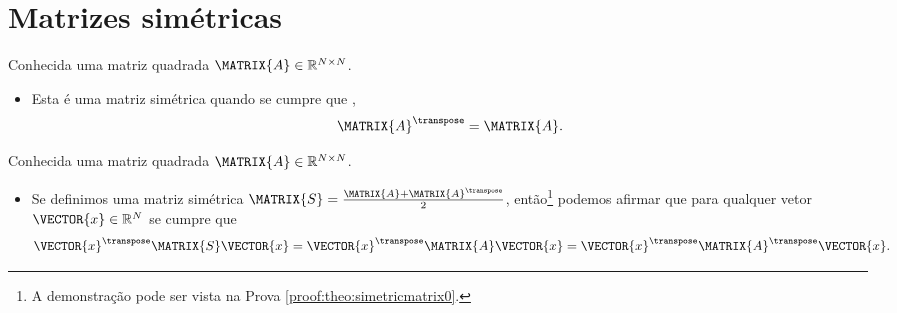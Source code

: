\section{ Matrizes simétricas}


\begin{definition}\label{def:symmetricmatrix0}
Conhecida uma matriz quadrada $\MATRIX{A} \in \mathbb{R}^{N \times N}$. 
\begin{itemize}
\item Esta é uma matriz simétrica quando se cumpre que \cite[pp. 18]{golub2013matrix}, 
\begin{equation}
\MATRIX{A}^{\transpose} = \MATRIX{A}.
\end{equation}
\end{itemize}
\end{definition}

\begin{theorem}\label{theo:simetricmatrix0}
Conhecida uma matriz quadrada $\MATRIX{A} \in \mathbb{R}^{N \times N}$.
\begin{itemize}
\item Se definimos uma matriz simétrica $\MATRIX{S}=\frac{\MATRIX{A}+\MATRIX{A}^{\transpose}}{2}$, 
então\footnote{A
demonstração pode ser vista na Prova \ref{proof:theo:simetricmatrix0}.} 
podemos afirmar que para qualquer vetor $\VECTOR{x} \in \mathbb{R}^{N}$ se cumpre que 
\begin{equation}
\VECTOR{x}^{\transpose}\MATRIX{S}\VECTOR{x} = 
\VECTOR{x}^{\transpose}\MATRIX{A}\VECTOR{x} =
\VECTOR{x}^{\transpose}\MATRIX{A}^{\transpose}\VECTOR{x}.
\end{equation}
\end{itemize}
\end{theorem}


